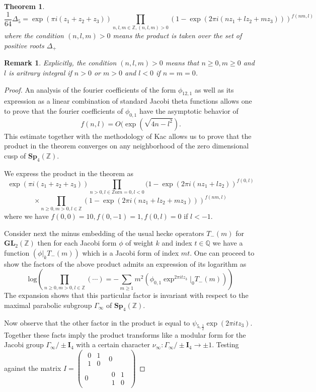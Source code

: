 \documentclass[9pt]{amsart} \usepackage[utf8]{inputenc}
\newtheorem{theorem}{Theorem}
\newtheorem{remark}{Remark}
\newcommand{\Q}{\mathbb{Q}}
\newcommand{\Z}{\mathbb{Z}} \newcommand{\C}{\mathbb{C}}
\newcommand{\Sp}{\mathbf{Sp}}
\newcommand{\GL}{\mathbf{GL}}
\newcommand{\Id}{\mathbf{I}}
\begin{document}
\begin{theorem}
$$\frac{1}{64} \Delta_5 = \exp(\pi i(z_1 + z_2 + z_3)) \displaystyle\prod_{n,l,m \in \Z,
(n,l,m) >0} (1 - \exp(2\pi i(nz_1 + lz_2 + mz_3)))^{f(nm,l)}$$ where the
condition $(n,l,m) > 0$ means the product is taken over the set of
positive roots $\Delta_+$
\end{theorem}

\begin{remark}
Explicitly, the condition $(n,l,m) > 0$ means that $n\geq 0,m\geq 0$ and
$l$ is aritrary integral if $n>0$ or $m > 0$ and $l<0$ if $n = m = 0$.
\end{remark}

\begin{proof}
An analysis of the fourier coefficients of the form $\phi_{12,1}$ as
well as its expression as a linear combination of standard Jacobi theta
functions allows one to prove that the fourier coefficients of
$\phi_{0,1}$ have the asymptotic behavior of $$f(n,l) =O(\exp(\sqrt{4n
-l^2}).$$ This estimate together with the methodology of Kac\cite{KAC:1}
allows us to prove that the product in the theorem converges on any
neighborhood of the zero dimensional cusp of $\Sp_4(\Z)$.

We express the product in the theorem as $$\exp(\pi i(z_1 + z_2 + z_3))
\displaystyle\prod_{n>0,l\in\Z \textrm{or} n=0, l<0}(1 -\exp(2\pi i(nz_1 +
lz_2))^{f(0,l)}$$ $$ \times \displaystyle\prod_{n\geq0,m>0,l\in\Z}(1 - \exp(2\pi i(n z_1 + l
z_2 + m z_3)))^{f(nm,l)}$$ where we have $f(0,0) = 10, f(0,-1) =1,
f(0,l) = 0$ if $l < -1$.


Consider next the minus embedding of the usual hecke operators
$T_{-}(m)$ for $\GL_2(\Z)$ then for each Jacobi form $\phi$ of weight
$k$ and index $t \in \Q$ we have a function $(\phi |_k T_{-}(m))$ which
is a Jacobi form of index $mt$. One can proceed to show the factors of
the above product admits an expression of its logarithm as
$$\textrm{log}(\displaystyle\prod_{n\geq 0,m>0,l\in\Z} (\cdots) = - \sum_{m\geq 1} m^2
(\phi_{0,1}\exp^{2\pi i t z_3}|_0 T_{-}(m)))$$ The expansion shows that
this particular factor is invariant with respect to the maximal
parabolic subgroup $\Gamma_{\infty}$ of $\Sp_4(\Z)$.

  Now observe that the other factor in the product is equal to
  $\psi_{5,\frac{1}{2}}\exp(2\pi i t z_3)$. Together these facts imply
  the product transforms like a modular form for the Jacobi group
  $\Gamma_{\infty} / \pm\Id_4$ with a certain character $\nu_{\infty} :
  \Gamma_{\infty} / \pm\Id_4 \rightarrow \pm 1$. Testing against the
  matrix $I = \begin{pmatrix}\begin{matrix}0 & 1\\ 1 & 0\end{matrix} & 0\\ 0 &
  \begin{matrix}0 & 1\\1 & 0\end{matrix}\end{pmatrix}$


\end{proof}
\end{document}
